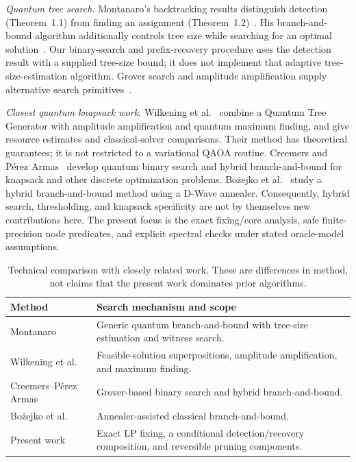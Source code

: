 \documentclass[pdflatex,sn-mathphys-num]{sn-jnl}
\begin{document}
\textit{Quantum tree search.} Montanaro's backtracking results distinguish detection (Theorem~1.1) from finding an assignment (Theorem~1.2)~\cite{ref35}. His branch-and-bound algorithm additionally controls tree size while searching for an optimal solution~\cite{ref24}. Our binary-search and prefix-recovery procedure uses the detection result with a supplied tree-size bound; it does not implement that adaptive tree-size-estimation algorithm. Grover search and amplitude amplification supply alternative search primitives~\cite{ref8,ref11}.

\textit{Closest quantum knapsack work.} Wilkening et al.~\cite{wilkening2025} combine a Quantum Tree Generator with amplitude amplification and quantum maximum finding, and give resource estimates and classical-solver comparisons. Their method has theoretical guarantees; it is not restricted to a variational QAOA routine. Creemers and P\'erez Armas~\cite{creemers2025} develop quantum binary search and hybrid branch-and-bound for knapsack and other discrete optimization problems. Bo\.{z}ejko et al.~\cite{bozejko2026} study a hybrid branch-and-bound method using a D-Wave annealer. Consequently, hybrid search, thresholding, and knapsack specificity are not by themselves new contributions here. The present focus is the exact fixing/core analysis, safe finite-precision node predicates, and explicit spectral checks under stated oracle-model assumptions.

\begin{table}[t]
\caption{Technical comparison with closely related work. These are differences in method, not claims that the present work dominates prior algorithms.}
\label{tab:related}
\centering\small
\begin{tabular}{lp{}}
\toprule
Method & Search mechanism and scope \\
\midrule
Montanaro~\cite{ref24} & Generic quantum branch-and-bound with tree-size estimation and witness search. \\
Wilkening et al.~\cite{wilkening2025} & Feasible-solution superpositions, amplitude amplification, and maximum finding. \\
Creemers--P\'erez Armas~\cite{creemers2025} & Grover-based binary search and hybrid branch-and-bound. \\
Bo\.{z}ejko et al.~\cite{bozejko2026} & Annealer-assisted classical branch-and-bound. \\
Present work & Exact LP fixing, a conditional detection/recovery composition, and reversible pruning components. \\
\bottomrule
\end{tabular}
\end{table}
\end{document}
